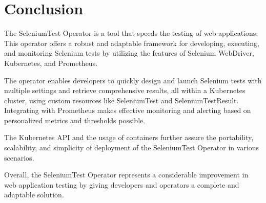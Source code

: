 \chapter{Conclusion}
\label{ch:sum}

The SeleniumTest Operator is a tool that speeds the testing of web applications. This operator offers a robust and adaptable framework for developing, executing, and monitoring Selenium tests by utilizing the features of Selenium WebDriver, Kubernetes, and Prometheus.

The operator enables developers to quickly design and launch Selenium tests with multiple settings and retrieve comprehensive results, all within a Kubernetes cluster, using custom resources like SeleniumTest and SeleniumTestResult. Integrating with Prometheus makes effective monitoring and alerting based on personalized metrics and thresholds possible.

The Kubernetes API and the usage of containers further assure the portability, scalability, and simplicity of deployment of the SeleniumTest Operator in various scenarios.

Overall, the SeleniumTest Operator represents a considerable improvement in web application testing by giving developers and operators a complete and adaptable solution.